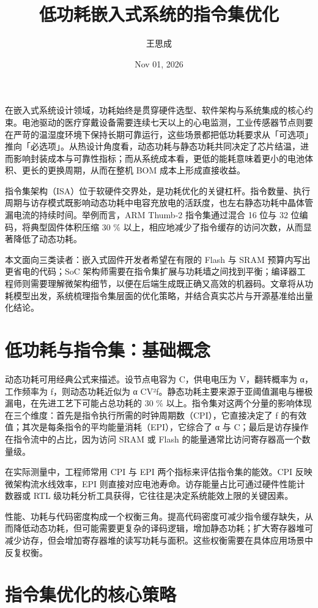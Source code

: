 \title{低功耗嵌入式系统的指令集优化}
\author{王思成}
\date{Nov 01, 2026}
\maketitle
在嵌入式系统设计领域，功耗始终是贯穿硬件选型、软件架构与系统集成的核心约束。电池驱动的医疗穿戴设备需要连续七天以上的心电监测，工业传感器节点则要在严苛的温湿度环境下保持长期可靠运行，这些场景都把低功耗要求从「可选项」推向「必选项」。从热设计角度看，动态功耗与静态功耗共同决定了芯片结温，进而影响封装成本与可靠性指标；而从系统成本看，更低的能耗意味着更小的电池体积、更长的更换周期，从而在整机 BOM 成本上形成直接收益。\par
指令集架构（ISA）位于软硬件交界处，是功耗优化的关键杠杆。指令数量、执行周期与访存模式既影响动态功耗中电容充放电的活跃度，也左右静态功耗中晶体管漏电流的持续时间。举例而言，ARM Thumb-2 指令集通过混合 16 位与 32 位编码，将典型固件体积压缩 30 \%{} 以上，相应地减少了指令缓存的访问次数，从而显著降低了动态功耗。\par
本文面向三类读者：嵌入式固件开发者希望在有限的 Flash 与 SRAM 预算内写出更省电的代码；SoC 架构师需要在指令集扩展与功耗墙之间找到平衡；编译器工程师则需要理解微架构细节，以便在后端生成既正确又高效的机器码。文章将从功耗模型出发，系统梳理指令集层面的优化策略，并结合真实芯片与开源基准给出量化结论。\par
\chapter{低功耗与指令集：基础概念}
动态功耗可用经典公式来描述。设节点电容为 C，供电电压为 V，翻转概率为 α，工作频率为 f，则动态功耗近似为 α CV²f。静态功耗主要来源于亚阈值漏电与栅极漏电，在先进工艺下可能占总功耗的 30 \%{} 以上。指令集对这两个分量的影响体现在三个维度：首先是指令执行所需的时钟周期数（CPI），它直接决定了 f 的有效值；其次是每条指令的平均能量消耗（EPI），它综合了 α 与 C；最后是访存操作在指令流中的占比，因为访问 SRAM 或 Flash 的能量通常比访问寄存器高一个数量级。\par
在实际测量中，工程师常用 CPI 与 EPI 两个指标来评估指令集的能效。CPI 反映微架构流水线效率，EPI 则直接对应电池寿命。访存能量占比可通过硬件性能计数器或 RTL 级功耗分析工具获得，它往往是决定系统能效上限的关键因素。\par
性能、功耗与代码密度构成一个权衡三角。提高代码密度可减少指令缓存缺失，从而降低动态功耗，但可能需要更复杂的译码逻辑，增加静态功耗；扩大寄存器堆可减少访存，但会增加寄存器堆的读写功耗与面积。这些权衡需要在具体应用场景中反复权衡。\par
\chapter{指令集优化的核心策略}
